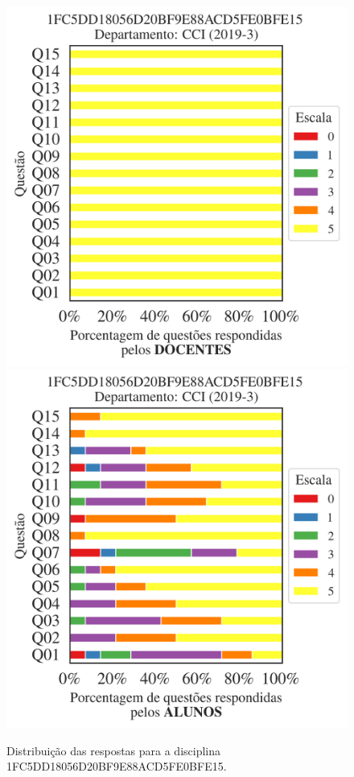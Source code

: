 \documentclass[a4paper,10pt]{article}
\begin{document}
\begin{figure}[h]
\centering
\includegraphics[width=0.485\linewidth]{analise_disciplina_departamento_CCI_1FC5DD18056D20BF9E88ACD5FE0BFE15_docentes.png}
\includegraphics[width=0.485\linewidth]{analise_disciplina_departamento_CCI_1FC5DD18056D20BF9E88ACD5FE0BFE15_alunos.png}
\caption{\label{fig:analise_geral_departamento}                Distribuição das respostas para a disciplina 1FC5DD18056D20BF9E88ACD5FE0BFE15. }
\end{figure}
\end{document}
